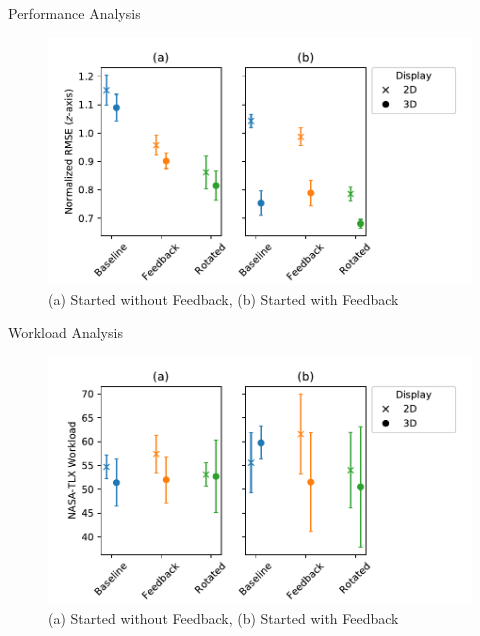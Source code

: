 \documentclass[10pt]{beamer}
\begin{document}
\begin{frame}[fragile]{Performance Analysis}
\begin{figure}
  \begin{center}
    \includegraphics[width=\linewidth]{../img/x_design_y_zrmse_hue_device_col_cbf_first.pdf}\\
    (a) Started without Feedback, (b) Started with Feedback
  \end{center}
\end{figure}
\end{frame}

\begin{frame}[fragile]{Workload Analysis}
\begin{figure}
  \begin{center}
    \includegraphics[width=\linewidth]{../img/x_design_y_tlx_hue_device_col_cbf_first.pdf}\\
    (a) Started without Feedback, (b) Started with Feedback
  \end{center}
\end{figure}
\end{frame}
\end{document}
